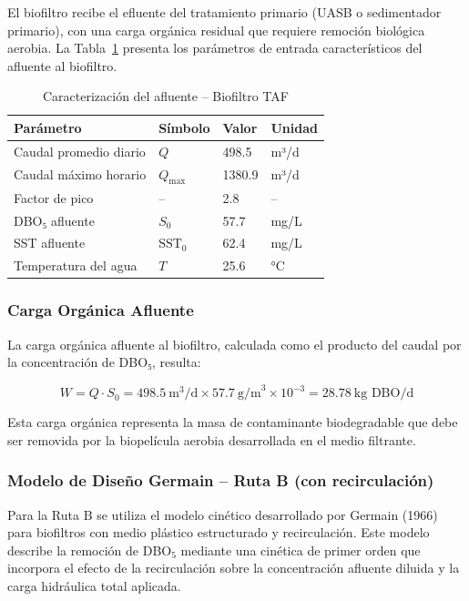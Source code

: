 \documentclass[12pt,a4paper]{article}
\begin{document}
El biofiltro recibe el efluente del tratamiento primario (UASB o sedimentador primario), con una carga orgánica residual que requiere remoción biológica aerobia. La Tabla~\ref{tab:entrada_taf} presenta los parámetros de entrada característicos del afluente al biofiltro.

\begin{table}[H]
\centering
\caption{Caracterización del afluente -- Biofiltro TAF}
\label{tab:entrada_taf}
\begin{tabular}{llll}
\toprule
\textbf{Parámetro} & \textbf{Símbolo} & \textbf{Valor} & \textbf{Unidad} \\
\midrule
Caudal promedio diario & $Q$ & 498.5 & m³/d \\
Caudal máximo horario & $Q_{\text{max}}$ & 1380.9 & m³/d \\
Factor de pico & -- & 2.8 & -- \\
DBO₅ afluente & $S_0$ & 57.7 & mg/L \\
SST afluente & $\text{SST}_0$ & 62.4 & mg/L \\
Temperatura del agua & $T$ & 25.6 & °C \\

\bottomrule
\end{tabular}
\end{table}

\subsubsection*{Carga Orgánica Afluente}

La carga orgánica afluente al biofiltro, calculada como el producto del caudal por la concentración de DBO₅, resulta:

\begin{equation}
W = Q \cdot S_0 = 498.5\ \text{m}^3\text{/d} \times 57.7\ \text{g/m}^3 \times 10^{-3} = 28.78\ \text{kg DBO/d}
\end{equation}

Esta carga orgánica representa la masa de contaminante biodegradable que debe ser removida por la biopelícula aerobia desarrollada en el medio filtrante.

\subsubsection*{Modelo de Diseño Germain -- Ruta B (con recirculación)}

Para la Ruta B se utiliza el modelo cinético desarrollado por Germain (1966) para biofiltros con medio plástico estructurado y recirculación. Este modelo describe la remoción de DBO$_5$ mediante una cinética de primer orden que incorpora el efecto de la recirculación sobre la concentración afluente diluida y la carga hidráulica total aplicada.
\end{document}
